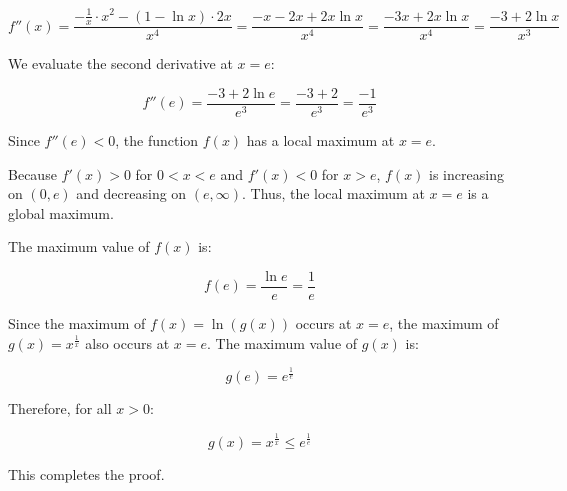 \documentclass{article}
\begin{document}
	$$f''(x) = \frac{-\frac{1}{x} \cdot x^2 - (1 - \ln x) \cdot 2x}{x^4} = \frac{-x - 2x + 2x \ln x}{x^4} = \frac{-3x + 2x \ln x}{x^4} = \frac{-3 + 2 \ln x}{x^3}$$
	
	We evaluate the second derivative at $x = e$:
	
	$$f''(e) = \frac{-3 + 2 \ln e}{e^3} = \frac{-3 + 2}{e^3} = \frac{-1}{e^3}$$
	
	Since $f''(e) < 0$, the function $f(x)$ has a local maximum at $x = e$.
	
	Because $f'(x) > 0$ for $0 < x < e$ and $f'(x) < 0$ for $x > e$, $f(x)$ is increasing on $(0, e)$ and decreasing on $(e, \infty)$. Thus, the local maximum at $x=e$ is a global maximum.
	
	The maximum value of $f(x)$ is:
	
	$$f(e) = \frac{\ln e}{e} = \frac{1}{e}$$
	
	Since the maximum of $f(x) = \ln(g(x))$ occurs at $x=e$, the maximum of $g(x) = x^{\frac{1}{x}}$ also occurs at $x=e$. The maximum value of $g(x)$ is:
	
	$$g(e) = e^{\frac{1}{e}}$$
	
	Therefore, for all $x > 0$:
	
	$$g(x) = x^{\frac{1}{x}} \leq e^{\frac{1}{e}}$$
	
	This completes the proof.
	
\end{document}
